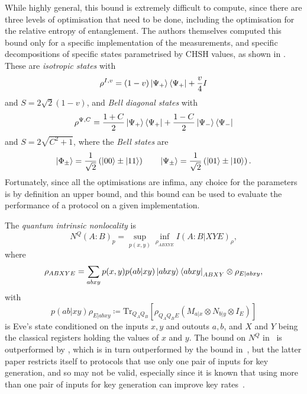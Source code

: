 \documentclass[10pt, a4paper]{article}
\numberwithin{equation}{section} %
\theoremstyle{definition}
\theoremstyle{plain}
\newcommand{\?}{\mathrel{?}} %
\newcommand{\Tr}{\mathrm{Tr}} %
\begin{document}
      While highly general, this bound is extremely difficult to compute, since there are three levels of optimisation that need to be done, including the optimisation for the relative entropy of entanglement. The authors themselves computed this bound only for a specific implementation of the measurements, and specific decompositions of specific states parametrised by CHSH values, as shown in . These are \emph{isotropic states} with
      \begin{equation}
        \rho^{I,v} = (1-v)\ket{\Psi_+}\bra{\Psi_+} + \frac{v}{4}I
      \end{equation}
      and \(S = 2\sqrt{2}(1-v)\), and \emph{Bell diagonal states} with
      \begin{equation}
        \rho^{\Psi,C} = \frac{1+C}{2}\ket{\Psi_+}\bra{\Psi_+} + \frac{1-C}{2}\ket{\Psi_-}\bra{\Psi_-}
      \end{equation}
      and \(S = 2\sqrt{C^2+1}\), where the \emph{Bell states} are
      \begin{equation}
        \ket{\Phi_{\pm}} = \frac{1}{\sqrt{2}}\left( \ket{00} \pm \ket{11} \right) \qquad \ket{\Psi_{\pm}} = \frac{1}{\sqrt{2}}\left( \ket{01} \pm \ket{10} \right).
      \end{equation}
      Fortunately, since all the optimisations are infima, any choice for the parameters is by definition an upper bound, and this bound can be used to evaluate the performance of a protocol on a given implementation.

      The \emph{quantum intrinsic nonlocality} is~\cite{DIQKD_Limits}
      \begin{equation}
        N^Q{(A:B)}_p = \sup_{p(x,y)} \inf_{\rho_{ABXYE}} I{(A:B|XYE)}_{\rho},
      \end{equation}
      where
      \begin{align}
        \rho_{ABXYE} = \sum_{abxy} p(x,y) p(ab|xy) \ket{abxy}\bra{abxy}_{ABXY} \otimes \rho_{E|abxy},
      \end{align}
      with
      \begin{equation}
        p(ab|xy) \rho_{E|abxy} \coloneqq \Tr_{Q_A Q_B}\left[\rho_{Q_A Q_B E} \left(M_{a|x} \otimes N_{b|y} \otimes I_{E}\right) \right]
      \end{equation}
      is Eve's state conditioned on the inputs \(x,y\) and outouts \(a,b\), and \(X\) and \(Y\) being the classical registers holding the values of \(x\) and \(y\). The bound on \(N^Q\) in~\cite{DIQKD_Limits} is outperformed by , which is in turn outperformed by the bound in~\cite[Appendix B]{RevisedPeres}, but the latter paper restricts itself to protocols that use only one pair of inputs for key generation, and so may not be valid, especially since it is known that using more than one pair of inputs for key generation can improve key rates~\cite{DIQKD_RandomKeyBasis}.
\end{document}

